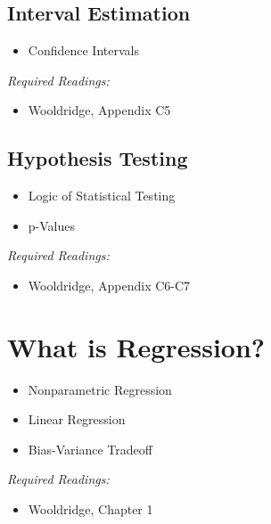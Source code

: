 \documentclass[PS]{syllabus}
\begin{document}
\begin{syllabus}
\subsection{Interval Estimation}
\begin{itemize}
   \item Confidence Intervals
\end{itemize}
\textit{Required Readings:}
\begin{itemize}
  \item Wooldridge, Appendix C5
\end{itemize}
\subsection{Hypothesis Testing}
\begin{itemize}
   \item Logic of Statistical Testing
   \item p-Values
\end{itemize}
\textit{Required Readings:}
\begin{itemize}
  \item Wooldridge, Appendix C6-C7
\end{itemize}




\section{What is Regression?}

\begin{itemize}
\item Nonparametric Regression
\item Linear Regression
\item Bias-Variance Tradeoff
\end{itemize}
\textit{Required Readings:} \begin{itemize}
  \item Wooldridge, Chapter 1
\end{itemize}


\end{syllabus}
\end{document}
